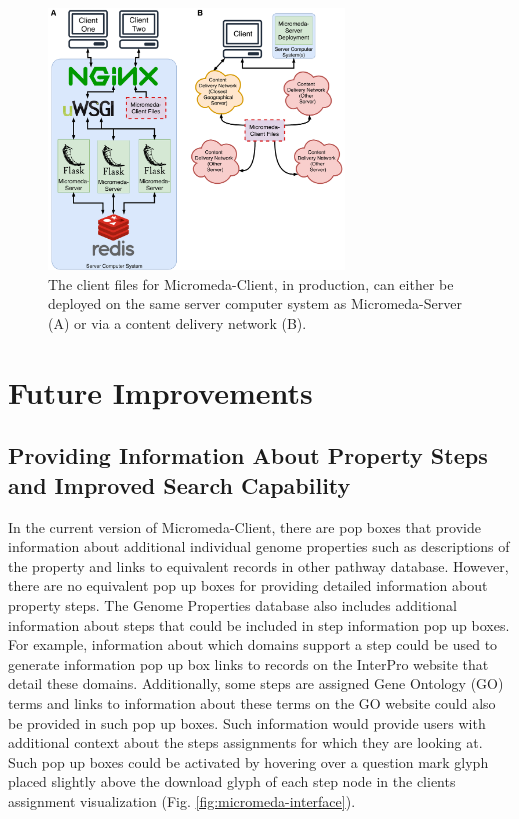 \begin{figure}[!ht]
  \centering
	\includegraphics[width=0.7\textwidth]{media/micromeda-client-deployment.pdf}
	 \caption{The client files for Micromeda-Client, in production, can either be deployed on the same server computer system as Micromeda-Server (A) or via a content delivery network (B).}
	 \label{fig:client-deployment}
\end{figure}

\section{Future Improvements} \label{client-improvements}



\subsection{Providing Information About Property Steps and Improved Search Capability}

In the current version of Micromeda-Client, there are pop boxes that provide information about additional individual genome properties such as descriptions of the property and links to equivalent records in other pathway database. However, there are no equivalent pop up boxes for providing detailed information about property steps. The Genome Properties database also includes additional information about steps that could be included in step information pop up boxes. For example, information about which domains support a step could be used to generate information pop up box links to records on the InterPro website that detail these domains. Additionally, some steps are assigned Gene Ontology (GO) terms and links to information about these terms on the GO website could also be provided in such pop up boxes. Such information would provide users with additional context about the steps assignments for which they are looking at. Such pop up boxes could be activated by hovering over a question mark glyph placed slightly above the download glyph of each step node in the clients assignment visualization (Fig. \ref{fig:micromeda-interface}).

